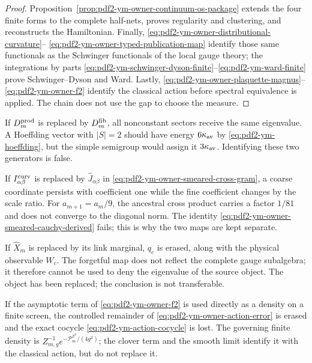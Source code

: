 \begin{proof}
Proposition~\ref{prop:pdf2-ym-owner-continuum-os-package} extends the
four finite forms to the
complete half-nets, proves regularity and clustering, and reconstructs the Hamiltonian.
Finally, \eqref{eq:pdf2-ym-owner-distributional-curvature}--
\eqref{eq:pdf2-ym-owner-typed-publication-map} identify those same functionals
as the Schwinger functionals of the local gauge theory; the integrations by parts
\eqref{eq:pdf2-ym-schwinger-dyson-finite}--\eqref{eq:pdf2-ym-ward-finite} prove
Schwinger--Dyson and Ward. Lastly,
\eqref{eq:pdf2-ym-owner-plaquette-magnus}--\eqref{eq:pdf2-ym-owner-f2} identify
the classical action before spectral equivalence is applied. The chain does not use the
gap to choose the measure.
\end{proof}

\begin{falsifier}
If $D_m^{\rm prod}$ is replaced by $D_m^{\rm fib}$, all nonconstant
sectors receive the same eigenvalue. A Hoeffding vector with $|S|=2$ should
have energy $6\kappa_{\rm av}$ by \eqref{eq:pdf2-ym-hoeffding}, but the
simple semigroup would assign it $3\kappa_{\rm av}$. Identifying these two
generators is false.
\end{falsifier}

\begin{falsifier}
If $I_{\alpha\beta}^{\rm curv}$ is replaced by
$\widehat J_{\alpha\beta}$ in
\eqref{eq:pdf2-ym-owner-smeared-cross-gram}, a coarse coordinate persists with
coefficient one while the fine coefficient changes by the scale ratio. For
$a_{m+1}=a_m/9$, the ancestral cross product carries a factor $1/81$ and does not converge
to the diagonal norm. The identity
\eqref{eq:pdf2-ym-owner-smeared-cauchy-derived} fails; this is why the two maps are
kept separate.
\end{falsifier}

\begin{falsifier}
If $\widehat X_m$ is replaced by its link marginal, $q_c$ is erased, along with
the physical observable $W_c$. The forgetful map does not reflect the complete gauge subalgebra;
it therefore cannot be used to deny the eigenvalue of the source object. The object
has been replaced; the conclusion is not transferable.
\end{falsifier}

\begin{falsifier}
If the asymptotic term of
\eqref{eq:pdf2-ym-owner-f2} is used directly as a density on a finite screen, the controlled remainder
of \eqref{eq:pdf2-ym-owner-action-error} is erased and the exact cocycle
\eqref{eq:pdf2-ym-action-cocycle} is lost. The governing finite density is
$Z_{m,g}^{-1}e^{-\mathcal P_m^{F^2}/(4g^2)}$; the clover term and the smooth limit
identify it with the classical action, but do not replace it.
\end{falsifier}

